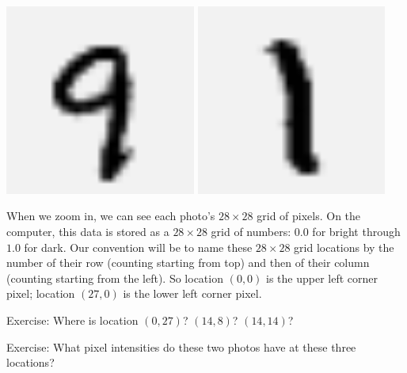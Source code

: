 \documentclass[11pt, justified]{tufte-book}
\newcommand{\attn}[1]{{\bro \textsf{#1}}}
\theoremstyle{definition}
\begin{document}
        \begin{marginfigure}
          \vspace{-3.5cm}
          \includegraphics[width=0.47\textwidth]{example-mnist/mnist-trn-00}%
            \hspace{0.03\textwidth}
          \includegraphics[width=0.47\textwidth]{example-mnist/mnist-trn-01}%
        \end{marginfigure}
        When we zoom in, we can see each photo's $28\times 28$ grid of pixels.
        On the computer, this data is stored as a $28\times 28$ grid of numbers:
        $0.0$ for bright through $1.0$ for dark.
        Our convention will be to name these $28\times28$ grid locations by the
        number of their row (counting starting from top) and then of their column
        (counting starting from the left).  So location $(0,0)$ is the upper
        left corner pixel; location $(27,0)$ is the lower left corner pixel.
        \par\noindent
        \attn{Exercise:} {Where is location $(0,27)$?  $(14,8)$?  $(14,14)$?}
        \par\noindent
        \attn{Exercise:} {What pixel intensities do these two photos have at these three locations?}
\end{document}

